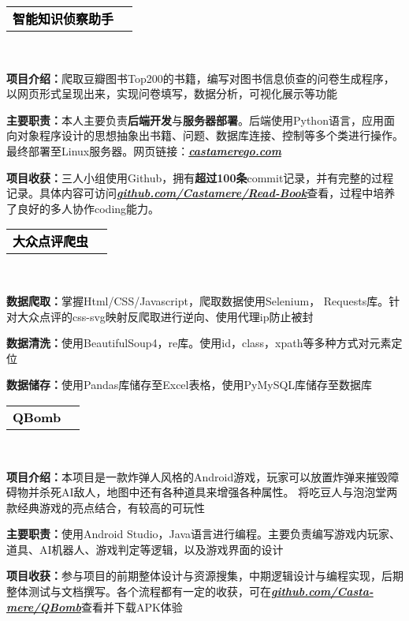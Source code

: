 \documentclass[10pt,A4]{article}
\renewcommand{\CJKglue}{\hskip 1.5pt}
\newcommand{\mpwidth}{\linewidth-\fboxsep-\fboxsep} %
\newcommand{\cvlist}[1] {


	\begin{itemize}
        {#1}
    \end{itemize}

    \vspace{3pt}

    }
\newcommand{\project}[3] {
    \vspace{2pt}

	\parbox{\mpwidth}{
		\begin{tabular*}{1\mpwidth}{p{0.65\mpwidth}  r}
            {\Large \textcolor{black}{\textbf{#2}}} & \colorbox{maincol}{\makebox[0.33\mpwidth]{\textcolor{white}{\textbf{#1}}}} \\
		\end{tabular*}\\
	}
    \begingroup
        \setlength{\baselineskip}{15pt}
        \renewcommand{\CJKglue}{\hskip 1.5pt}
        #3
    \endgroup
}
\begin{document}
\begin{paracol}{2}
\begin{leftcolumn}
        \project
        {2022-09\enspace 至\enspace 2022-12}
        {智能知识侦察助手}
        {\cvlist{
                \item \textbf{项目介绍：}爬取豆瓣图书Top200的书籍，编写对图书信息侦查的问卷生成程序，以网页形式呈现出来，实现问卷填写，数据分析，可视化展示等功能
                \item \textbf{主要职责：}本人主要负责\textbf{后端开发}与\textbf{服务器部署}。后端使用Python语言，应用面向对象程序设计的思想抽象出书籍、问题、数据库连接、控制等多个类进行操作。最终部署至Linux服务器。网页链接：\href{http://castamerego.com/}{\textbf{\emph{castamerego.com}}}
                \item \textbf{项目收获：}三人小组使用Github，拥有\textbf{超过100条}commit记录，并有完整的过程记录。具体内容可访问\enspace \href{https://github.com/Castamere/Read-Book}{\textbf{\emph{github.com/Castamere/Read-Book}}}\enspace 查看，过程中培养了良好的多人协作coding能力。
            }
        }

        \vspace{5pt}

        \project
        {2021-09\enspace 至\enspace 2021-10}
        {大众点评爬虫}
        {\cvlist{
                \item \textbf{数据爬取：}掌握Html/CSS/Javascript，爬取数据使用Selenium， Requests库。针对大众点评的css-svg映射反爬取进行逆向、使用代理ip防止被封
                \item \textbf{数据清洗：}使用BeautifulSoup4，re库。使用id，class，xpath等多种方式对元素定位
                \item \textbf{数据储存：}使用Pandas库储存至Excel表格，使用PyMySQL库储存至数据库
            }
        }
        \vspace{5pt}

        \project
        {2023-05\enspace 至\enspace 2023-06}
        {QBomb}
        {\cvlist{
                \item \textbf{项目介绍：}本项目是一款炸弹人风格的Android游戏，玩家可以放置炸弹来摧毁障碍物并杀死AI敌人，地图中还有各种道具来增强各种属性。 将吃豆人与泡泡堂两款经典游戏的亮点结合，有较高的可玩性
                \item \textbf{主要职责：}使用Android Studio，Java语言进行编程。主要负责编写游戏内玩家、道具、AI机器人、游戏判定等逻辑，以及游戏界面的设计
                \item \textbf{项目收获：}参与项目的前期整体设计与资源搜集，中期逻辑设计与编程实现，后期整体测试与文档撰写。各个流程都有一定的收获，可在\href{https://github.com/Casta-mere/QBomb}{\textbf{\emph{github.com/Casta-mere/QBomb}}}查看并下载APK体验
            }
        }
        \vspace{5pt}


\end{leftcolumn}
\end{paracol}
\end{document}
